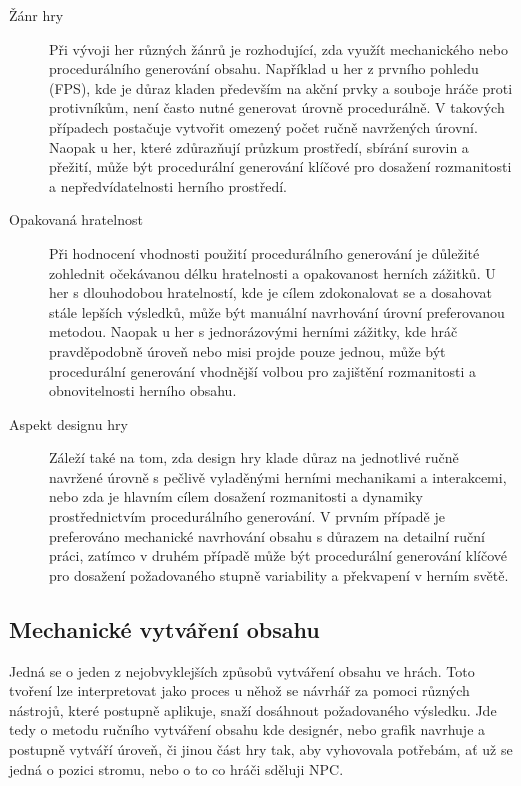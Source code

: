 \begin{description}
\item[Žánr hry] Při vývoji her různých žánrů je rozhodující, zda využít mechanického nebo procedurálního generování obsahu. Například u her z prvního pohledu (FPS), kde je důraz kladen především na akční prvky a souboje hráče proti protivníkům, není často nutné generovat úrovně procedurálně. V takových případech postačuje vytvořit omezený počet ručně navržených úrovní. Naopak u her, které zdůrazňují průzkum prostředí, sbírání surovin a přežití, může být procedurální generování klíčové pro dosažení rozmanitosti a nepředvídatelnosti herního prostředí.

\item[Opakovaná hratelnost] Při hodnocení vhodnosti použití procedurálního generování je důležité zohlednit očekávanou délku hratelnosti a opakovanost herních zážitků. U her s dlouhodobou hratelností, kde je cílem zdokonalovat se a dosahovat stále lepších výsledků, může být manuální navrhování úrovní preferovanou metodou. Naopak u her s jednorázovými herními zážitky, kde hráč pravděpodobně úroveň nebo misi projde pouze jednou, může být procedurální generování vhodnější volbou pro zajištění rozmanitosti a obnovitelnosti herního obsahu.

\item[Aspekt designu hry] Záleží také na tom, zda design hry klade důraz na jednotlivé ručně navržené úrovně s pečlivě vyladěnými herními mechanikami a interakcemi, nebo zda je hlavním cílem dosažení rozmanitosti a dynamiky prostřednictvím procedurálního generování. V prvním případě je preferováno mechanické navrhování obsahu s důrazem na detailní ruční práci, zatímco v druhém případě může být procedurální generování klíčové pro dosažení požadovaného stupně variability a překvapení v herním světě.
\end{description}

\subsection{Mechanické vytváření obsahu}
\label{traditional}
Jedná se o jeden z nejobvyklejších způsobů vytváření obsahu ve hrách. Toto tvoření lze interpretovat jako proces u něhož se návrhář za pomoci různých nástrojů, které postupně aplikuje, snaží dosáhnout požadovaného výsledku. Jde tedy o metodu ručního vytváření obsahu kde designér, nebo grafik navrhuje a postupně vytváří úroveň, či jinou část hry tak, aby vyhovovala potřebám, ať už se jedná o pozici stromu, nebo o to co hráči sděluji NPC.

